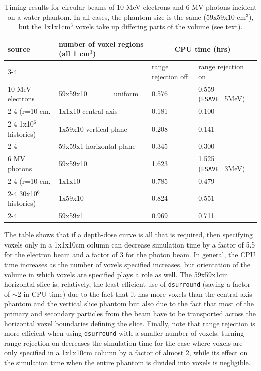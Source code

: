 \documentclass[12pt,twoside]{article}      %
\begin{document}
\begin{table}[htbp]
\caption{Timing results for circular beams of 10 MeV electrons and 6 MV
photons incident on a water phantom.
In all cases, the phantom size is the same (59x59x10 cm$^3$), but the
1x1x1cm$^3$ voxels take up differing parts of the volume (see text).}
\label{dsurround_table}
\begin{tabular}{|p{3cm}|p{3cm}|p{4cm}|p{4cm}|}
\hline
source & number of voxel regions (all 1 cm$^3$) & \multicolumn{2}{|c|}{CPU time (hrs)}\\
\cline{3-4}
       &             & range rejection off & range rejection on \\
\hline
\hline
10 MeV electrons & 59x59x10~~~~~~~ uniform & 0.576 & 0.559 ({\tt ESAVE}=5MeV)\\
\cline{2-4}
(r=10 cm, & 1x1x10 central axis & 0.181 & 0.100 \\
\cline{2-4}
1x10$^{6}$ histories) & 1x59x10 vertical plane & 0.208 & 0.141\\
\cline{2-4}
 & 59x59x1 horizontal plane & 0.345 & 0.300\\
\hline
\hline
6 MV photons & 59x59x10 & 1.623 & 1.525 ({\tt ESAVE}=3MeV)\\
\cline{2-4}
(r=10 cm, & 1x1x10 & 0.785 & 0.479\\
\cline{2-4}
30x10$^{6}$ histories) & 1x59x10 & 0.824 & 0.551\\
\cline{2-4}
 & 59x59x1 & 0.969 & 0.711\\
\hline
\end{tabular}
\end{table}

The table shows that if a depth-dose curve is all that is required, then
specifying voxels only in a 1x1x10cm column can decrease
simulation time by a factor of 5.5 for the electron beam and
a factor of 3 for the photon beam.
In general, the CPU time increases
as the number of voxels specified increases, but orientation of the volume
in which voxels are specified plays a role as well.
The 59x59x1cm horizontal slice
is, relatively, the least efficient use of {\tt dsurround} (saving a factor of
$\sim$2 in CPU time) due to the fact that it has more voxels than the
central-axis phantom and the vertical slice phantom but also due to the fact
that most of the primary and secondary particles from the beam have to be
transported across the
horizontal voxel boundaries defining the slice.  Finally, note that range
rejection is
more efficient when using {\tt dsurround} with a smaller number of
voxels:
turning range rejection on decreases the
simulation time for the case where voxels are only specified in a 1x1x10cm
column by a factor of almost 2, while
its effect on the simulation time when the entire phantom is divided into
voxels is negligible.
\end{document}
